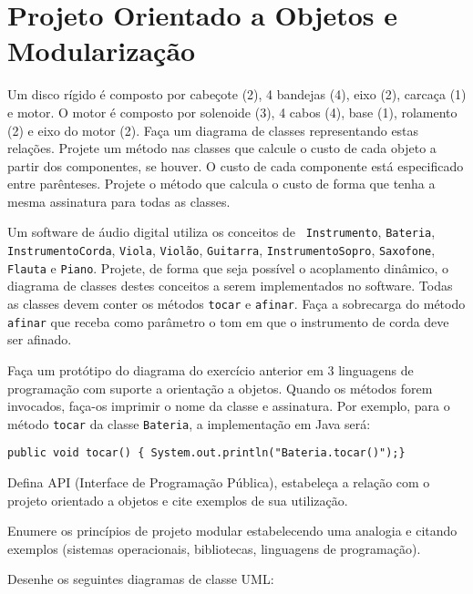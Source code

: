 \section*{Projeto Orientado a Objetos e Modularização}

\Q Um disco rígido é composto por cabeçote (2), 4 bandejas (4), eixo
(2), carcaça (1) e motor. O motor é composto por solenoide (3), 4
cabos (4), base (1), rolamento (2) e eixo do motor (2).  Faça um
diagrama de classes representando estas relações. Projete um método
nas classes que calcule o custo de cada objeto a partir dos
componentes, se houver. O custo de cada componente está especificado
entre parênteses. Projete o método que calcula o custo de forma que
tenha a mesma assinatura para todas as classes.

\Q Um software de áudio digital utiliza os conceitos de {\tt
  Instrumento}, {\tt Bateria}, {\tt InstrumentoCorda}, {\tt Viola},
{\tt Violão}, {\tt Guitarra}, {\tt InstrumentoSopro}, {\tt Saxofone},
{\tt Flauta} e {\tt Piano}. Projete, de forma que seja
possível o acoplamento dinâmico, o diagrama de classes destes
conceitos a serem implementados no software. Todas as classes devem
conter os métodos {\tt tocar} e {\tt afinar}. Faça a sobrecarga do
método {\tt afinar} que receba como parâmetro o tom em que o
instrumento de corda deve ser afinado.

\Q Faça um protótipo do diagrama do exercício anterior em 3 linguagens
de programação com suporte a orientação a objetos. Quando os métodos
forem invocados, faça-os imprimir o nome da classe e assinatura. Por
exemplo, para o método {\tt tocar} da classe {\tt Bateria}, a
implementação em Java será:

\medskip\hfil{\small\tt public void tocar() \{ System.out.println("Bateria.tocar()");\}}

\Q Defina API (Interface de Programação Pública), estabeleça a relação
com o projeto orientado a objetos e cite exemplos de sua utilização.

\Q Enumere os princípios de projeto modular estabelecendo uma analogia
e citando exemplos (sistemas operacionais, bibliotecas, linguagens de
programação).

 Desenhe os seguintes diagramas de classe UML:

